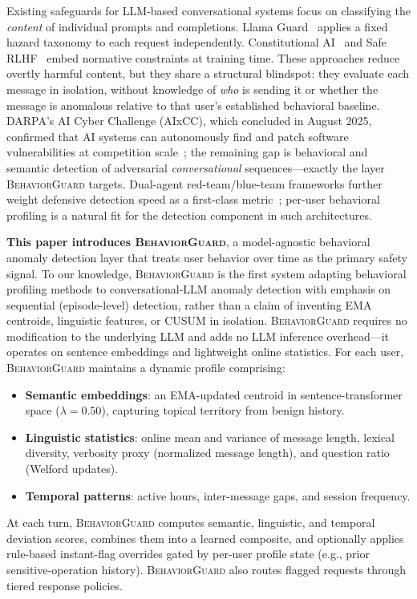 \documentclass[conference]{IEEEtran}
\newcommand{\BG}{\textsc{BehaviorGuard}}
\begin{document}
Existing safeguards for LLM-based conversational systems focus on classifying the
\emph{content} of individual prompts and completions.
Llama Guard~\cite{inan2023llamaguard,meta2024llamaguard3} applies a fixed hazard
taxonomy to each request independently.
Constitutional AI~\cite{bai2022constitutional} and Safe RLHF~\cite{dai2023saferlhf}
embed normative constraints at training time.
These approaches reduce overtly harmful content, but they share a structural blindspot:
they evaluate each message in isolation, without knowledge of \emph{who} is sending it
or whether the message is anomalous relative to that user's established behavioral
baseline.
DARPA's AI Cyber Challenge (AIxCC), which concluded in August 2025, confirmed that AI
systems can autonomously find and patch software vulnerabilities at competition
scale~\cite{darpa2025aixcc}; the remaining gap is behavioral and semantic detection
of adversarial \emph{conversational} sequences---exactly the layer \BG{} targets.
Dual-agent red-team/blue-team frameworks further weight defensive detection speed as a
first-class metric~\cite{farzulla2025redblue}; per-user behavioral profiling is a
natural fit for the detection component in such architectures.

\textbf{This paper introduces \BG{}}, a model-agnostic behavioral anomaly detection
layer that treats user behavior over time as the primary safety signal.
To our knowledge, \BG{} is the first system adapting behavioral profiling methods
to conversational-LLM anomaly detection with emphasis on sequential (episode-level)
detection, rather than a claim of inventing EMA centroids, linguistic features, or
CUSUM in isolation.
\BG{} requires no modification to the underlying LLM and adds no LLM inference
overhead---it operates on sentence embeddings and lightweight online statistics.
For each user, \BG{} maintains a dynamic profile comprising:
\begin{itemize}[noitemsep]
  \item \textbf{Semantic embeddings}: an EMA-updated centroid in sentence-transformer
        space ($\lambda{=}0.50$), capturing topical territory from benign history.
  \item \textbf{Linguistic statistics}: online mean and variance of message length,
        lexical diversity, verbosity proxy (normalized message length), and question
        ratio (Welford updates).
  \item \textbf{Temporal patterns}: active hours, inter-message gaps, and session
        frequency.
\end{itemize}
At each turn, \BG{} computes semantic, linguistic, and temporal deviation scores,
combines them into a learned composite, and optionally applies rule-based instant-flag
overrides gated by per-user profile state (e.g., prior sensitive-operation history).
\BG{} also routes flagged requests through tiered response policies.
\end{document}
